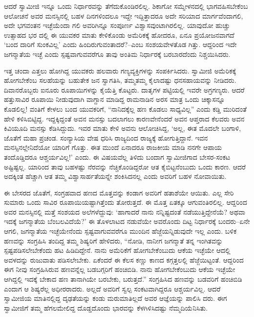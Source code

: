 ಆದರೆ ಸ್ವಾಮೀಜಿ ಇನ್ನೂ ಒಂದು ನಿರ್ಧಾರವನ್ನು ತೆಗೆದುಕೊಂಡಿರಲಿಲ್ಲ. ಶಿಕಾಗೋ ಸಮ್ಮೇಳನದಲ್ಲಿ ಭಾಗವಹಿಸಬೇಕೆಂಬ ಆಲೋಚನೆ ಅವರ ಮನಸ್ಸಿನಲ್ಲಿ ಬಹಳ ದಿನಗಳಿಂದಲೂ ಇದ್ದೇ ಇದ್ದಿತ್ತಾದರೂ ಅದೇ ಸರಿಯಾದ ಮಾರ್ಗವೆಂದಾಗಲಿ, ಅದೇ ಭಗವಂತನ ಇಚ್ಛೆಯೆಂದಾ ಗಲಿ ಅವರಿಗಿನ್ನೂ ಸಂಪೂರ್ಣ ವಿಶ್ವಾಸವುಂಟಾಗಿರಲಿಲ್ಲ. ಯಾವುದೋ ಹುಚ್ಚು ಉತ್ಸಾಹದ ಭರ ದಲ್ಲಿ ಈ ಯುವಕರ ಮಾತು ಕೇಳಿಕೊಂಡು ಅಮೆರಿಕಕ್ಕೆ ಹೋದರೂ, ಏನೂ ಪ್ರಯೋಜನವಾಗದೆ ‘ಬಂದ ದಾರಿಗೆ ಸುಂಕವಿಲ್ಲ’ ಎಂದು ಹಿಂದಿರುಗುವಂತಾದರೆ?–ಎಂಬ ಸಂಶಯವೇಳತೊಡ ಗಿತ್ತು. ಆದ್ದರಿಂದ ಇದೇ ಜಗನ್ಮಾತೆಯ ಇಚ್ಛೆ ಎಂದು ಸ್ಪಷ್ಟವಾಗುವವರೆಗೂ ತಾವು ಅಂತಿಮ ನಿರ್ಧಾರಕ್ಕೆ ಬರಬಾರದೆಂದು ನಿಶ್ಚಯಿಸಿದರು.

ಇತ್ತ ಚಂದಾ ಎತ್ತಲು ಹೋಗಿದ್ದ ಯುವಕರು ಹಲವಾರು ಗಣ್ಯವ್ಯಕ್ತಿಗಳನ್ನು ಸಂಪರ್ಕಿಸಿದರು. ಸ್ವಾಮೀಜಿ ಅಮೆರಿಕಕ್ಕೆ ಹೋಗಬೇಕೆಂಬ ಸಲಹೆಯನ್ನು ಬಹುತೇಕ ಜನ ಸ್ವಾಗತಿಸಿ, ತಮ್ಮತಮ್ಮ ಕೈಲಾದಷ್ಟು ಧನಸಹಾಯವನ್ನು ನೀಡಿದರು. ದಿವಾನರೊಬ್ಬರು ಐನೂರು ರೂಪಾಯಿಗಳನ್ನು ಕೈಯೆತ್ತಿ ಕೊಟ್ಟರು. ದಾತೃಗಳ ಪಟ್ಟಿಯಲ್ಲಿ ಇವರೇ ಅಗ್ರಗಣ್ಯರು. ಆದರೆ ಹತ್ತುಸಾವಿರ ರೂಪಾಯಿ ನೀಡುವುದಾಗಿ ವಾಗ್ದಾನ ಮಾಡಿದ್ದ ರಾಮನಾಡಿನ ಅರಸ ಮಾತ್ರ ಒಂದು ಚಿಕ್ಕಾಸನ್ನೂ ಕೊಡಲಿಲ್ಲ! ವಂತಿಗೆ ಕೇಳಲು ಬಂದ ಯುವಕರಿಗೆ, “ನಾನಿದಕ್ಕೆಲ್ಲ ಹಣ ಕೊಡಲು ಸಾಧ್ಯವಿಲ್ಲ” ಎಂದು ಕಡ್ಡಿ ಮುರಿದಂತೆ ಹೇಳಿ ಕಳಿಸಿಬಿಟ್ಟಿದ್ದ. ಇದ್ದಕ್ಕಿದ್ದಂತೆ ಅವನ ಮನಸ್ಸು ಬದಲಾಗಲು ಕಾರಣವೇನೆಂದರೆ ಅವನ ಆಪ್ತರಾದ ಕೆಲವರು ಅವನ ಕಿವಿಯೂದಿ ಮನಸ್ಸು ಕೆಡಿಸಿದ್ದುದು. ಇವರ ಮಾತು ಕೇಳಿ ಅವನು ಆಲೋಚಿಸಿದ್ದ, ‘ಅಲ್ಲ, ಈತ ಮೊದಲೇ ಬಂಗಾಳಿ, ಜೊತೆಗೆ ಮಹಾ ಪ್ರಚಂಡ. ಸಂನ್ಯಾಸಿಯ ವೇಷ ಧರಿಸಿ ರಾಜ್ಯದಿಂದ ರಾಜ್ಯಕ್ಕೆ ಹೋಗುತ್ತಿದ್ದಾನೆ. ಇವನ ಮನಸ್ಸಿನಲ್ಲೇನಿದೆಯೋ ಯಾರಿಗೆ ಗೊತ್ತು. ಈತ ಮುಂದೆ ಏನಾದರೂ ರಾಜಕೀಯ ಮಾಡಿ ನನಗೇ ಆಪಾಯ ತಂದೊಡ್ಡಿದರೂ ಆಶ್ಚರ್ಯವಿಲ್ಲ!’ ಎಂದು. ಈ ವಿಷಯವೆಲ್ಲ ತಿಳಿದು ಬಂದಾಗ ಸ್ವಾಮೀಜಿಗಾದ ಬೇಸರ-ಸಂಕಟ ಅಷ್ಟಿಷ್ಟಲ್ಲ. ಯಾರಿಂದ ತಾವು ಬಹಳಷ್ಟು ನೆರವನ್ನು ನೆಚ್ಚಿಕೊಂಡಿದ್ದರೋ ಆತ ಕೈಬಿಟ್ಟನೆಂಬುದು ಒಂದು ಕಾರಣ. ಆದರೆ ಅದಕ್ಕಿಂತ ಹೆಚ್ಚಾಗಿ ಆತ ತಮ್ಮ ವಿಶ್ವಾಸಾರ್ಹತೆಯನ್ನೇ ಶಂಕಿಸಿದನಲ್ಲ ಎಂದು ಅವರಿಗೆ ಬಹಳ ನೋವಾಯಿತು.

ಈ ಬೇಸರದ ಜೊತೆಗೆ, ಸಂಗ್ರಹವಾದ ಹಣದ ಮೊತ್ತವನ್ನು ಕಂಡಾಗ ಅವರಿಗೆ ಹತಾಶೆಯೇ ಆಯಿತು. ಎಲ್ಲ ಸೇರಿ ಸುಮಾರು ಒಂದು ಸಾವಿರ ರೂಪಾಯಿಯಷ್ಟಾಗಿತ್ತೆಂದು ತೋರುತ್ತದೆ. ಈ ಮೊತ್ತ ಏತಕ್ಕೂ ಆಗುವಂತಿರಲಿಲ್ಲ. ಆದ್ದರಿಂದ ಅವರ ಮನಸ್ಸಿನಲ್ಲಿ ಮತ್ತೆ ಸಂಶಯದ ಅಲೆಗಳೆದ್ದುವು: ‘ಹಾಗಾದರೆ ನಾನು ನನ್ನಿಷ್ಟದಂತೆ ನಡೆಯುತ್ತಿದ್ದೇನೆಯೆ? ಅಥವಾ ಇದಕ್ಕೆ ಜಗನ್ಮಾತೆಯ ಬೆಂಬಲವಿದೆಯೆ?’ ಈ ತೊಳಲಾಟದ ನಡುವೆಯೇ ಅವರೊಂದು ದಿಟ್ಟ ನಿರ್ಧಾರಕ್ಕೆ ಬಂದರು–ಏನೇ ಆಗಲಿ, ಜಗನ್ಮಾತೆಯ ಇಚ್ಛೆಯೇನೆಂದು ಸ್ಪಷ್ಟವಾಗುವವರೆಗೂ ಮುಂದಿನ ಹೆಜ್ಜೆಯನ್ನಿಡುವುದೇ ಇಲ್ಲ ಎಂದು. ಬಳಿಕ ಹಣವನ್ನು ಸಂಗ್ರಹಿಸಿ ತಂದಿದ್ದ ತಮ್ಮ ಶಿಷ್ಯರಿಗೆ ಹೇಳಿದರು, “ನೋಡಿ, ನಾನೀಗ ಜಗನ್ಮಾತೆ ತನ್ನ ಇಂಗಿತವನ್ನು ಸ್ಪಷ್ಟಪಡಿಸಲೇಬೇಕೆಂದು ಹಟ ಹಿಡಿದಿದ್ದೇನೆ. ನಾನು ಅಮೆರಿಕೆಗೆ ಹೋಗಬೇಕೆಂಬುದು ಆಕೆಯ ಇಚ್ಛೆಯೇ ಆದಲ್ಲಿ ಅವಳದನ್ನು ರುಜುವಾತು ಪಡಿಸಲೇಬೇಕು. ಏಕೆಂದರೆ ಈ ಕೆಲಸ ಕಣ್ಣು ಕಾಣದ ಕಗ್ಗತ್ತಲಲ್ಲಿ ಹೆಜ್ಜೆಯಿಟ್ಟಂತೆ. ಆದ್ದರಿಂದ ಈಗ ನೀವು ಸಂಗ್ರಹಿಸಿರುವ ಹಣವನ್ನೆಲ್ಲ ಬಡಬಗ್ಗರಿಗೆ ಹಂಚಿಬಿಡಿ. ನಾನು ಹೋಗಬೇಕೆಂಬುದು ಆಕೆಯ ಇಚ್ಛೆಯೇ ಆಗಿದ್ದಲ್ಲಿ ಇದಕ್ಕೆ ಬೇಕಾದ ಹಣ ತಾನಾಗಿಯೇ ಬರಬೇಕು, ಬರುತ್ತದೆ.” ಸಂಗ್ರಹಿಸಿದ ಹಣವನ್ನು ಬಡವರಿಗೆ ಹಂಚಿಬಿಡಿ ಎಂದಾಗ ಆ ಶಿಷ್ಯರೆಲ್ಲ ಅಧೀರರಾದರು. ಅಲ್ಲದೆ ಅವರಿಗೆ ಸ್ವಲ್ಪ ಸಂಕಟವಾಗಿದ್ದರೂ ಆಶ್ಚರ್ಯವಿಲ್ಲ. ಆದರೆ ಸ್ವಾಮೀಜಿಯ ಮಾತಿನಲ್ಲಿದ್ದ ದೃಢತೆಯನ್ನು ಕಂಡು ಮರುಮಾತಿಲ್ಲದೆ ಅವರ ಆಜ್ಞೆಯನ್ನು ಪಾಲಿಸಿ ದರು. ಈಗ ಸ್ವಾಮೀಜಿಗೆ ತಮ್ಮ ಹೆಗಲಮೇಲಿದ್ದ ದೊಡ್ಡದೊಂದು ಭಾರವನ್ನು ಕೆಳಗಿಳಿಸಿದಷ್ಟು ನೆಮ್ಮದಿಯೆನಿಸಿತು.


